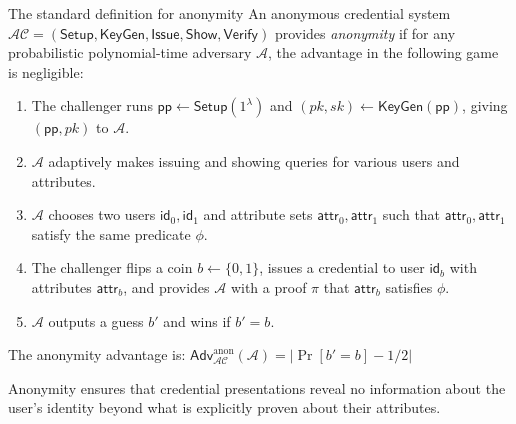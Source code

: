 \begin{definition}[Anonymity]\label{def:anonymity}
The standard definition for anonymity \cite{goos_efficient_2001} An anonymous credential system $\mathcal{AC} = (\mathsf{Setup}, \mathsf{KeyGen}, \mathsf{Issue}, \mathsf{Show}, \mathsf{Verify})$ provides \emph{anonymity} if for any probabilistic polynomial-time adversary $\mathcal{A}$, the advantage in the following game is negligible:

\begin{enumerate}
\item The challenger runs $\mathsf{pp} \leftarrow \mathsf{Setup}(1^\lambda)$ and $(pk, sk) \leftarrow \mathsf{KeyGen}(\mathsf{pp})$, giving $(\mathsf{pp}, pk)$ to $\mathcal{A}$.
\item $\mathcal{A}$ adaptively makes issuing and showing queries for various users and attributes.
\item $\mathcal{A}$ chooses two users $\mathsf{id}_0, \mathsf{id}_1$ and attribute sets $\mathsf{attr}_0, \mathsf{attr}_1$ such that $\mathsf{attr}_0, \mathsf{attr}_1$ satisfy the same predicate $\phi$.
\item The challenger flips a coin $b \leftarrow \{0,1\}$, issues a credential to user $\mathsf{id}_b$ with attributes $\mathsf{attr}_b$, and provides $\mathcal{A}$ with a proof $\pi$ that $\mathsf{attr}_b$ satisfies $\phi$.
\item $\mathcal{A}$ outputs a guess $b'$ and wins if $b' = b$.
\end{enumerate}

The anonymity advantage is: $\mathsf{Adv}^{\text{anon}}_{\mathcal{AC}}(\mathcal{A}) = |\Pr[b' = b] - 1/2|$

Anonymity ensures that credential presentations reveal no information about the user's identity beyond what is explicitly proven about their attributes.
\end{definition}







